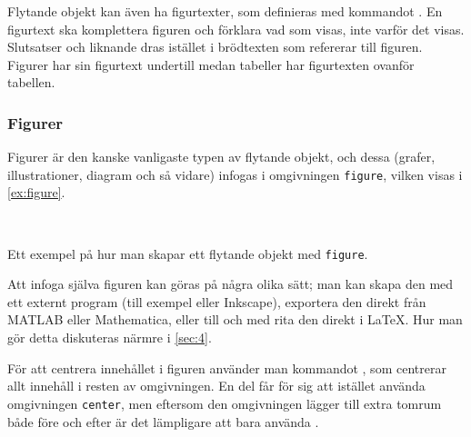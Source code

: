 \documentclass[10pt,../../a4.tex]{subfiles}
\begin{document}
Flytande objekt kan även ha figurtexter, som definieras med kommandot
. En figurtext ska komplettera figuren och förklara vad som
visas, inte varför det visas. Slutsatser och liknande dras istället i
brödtexten som refererar till figuren. Figurer har sin figurtext undertill
medan tabeller har figurtexten ovanför tabellen.

\subsubsection{Figurer}
Figurer är den kanske vanligaste typen av flytande objekt, och dessa
(grafer, illustrationer, diagram och så vidare) infogas i omgivningen
\texttt{figure}, vilken visas i \cref{ex:figure}.

\begin{kod}
	\centering\hspace{0.0075\textwidth}
	\begin{minipage}{0.75\textwidth} %
			\vfil{}\vfil
	\end{minipage}
	\\ \medskip
	\begin{minipage}{0.725\textwidth} %
	\end{minipage}
	\caption{Ett exempel på hur man skapar ett flytande objekt med
	\texttt{figure}.}
	\label{ex:figure}
\end{kod}

Att infoga själva figuren kan göras på några olika sätt; man kan skapa den
med ett externt program (till exempel  eller Inkscape), 
exportera den direkt från MATLAB eller Mathematica, eller till och med
rita den direkt i \LaTeX. Hur man gör detta diskuteras närmre i
\cref{sec:4}.

För att centrera innehållet i figuren använder man kommandot 
, som centrerar allt innehåll i resten av omgivningen. En
del får för sig att istället använda omgivningen \texttt{center}, men
eftersom den omgivningen lägger till extra tomrum både före och efter är
det lämpligare att bara använda .
\end{document}
